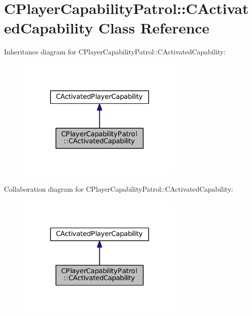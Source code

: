 \hypertarget{classCPlayerCapabilityPatrol_1_1CActivatedCapability}{}\section{C\+Player\+Capability\+Patrol\+:\+:C\+Activated\+Capability Class Reference}
\label{classCPlayerCapabilityPatrol_1_1CActivatedCapability}


Inheritance diagram for C\+Player\+Capability\+Patrol\+:\+:C\+Activated\+Capability\+:
\nopagebreak
\begin{figure}[H]
\begin{center}
\leavevmode
\includegraphics[width=227pt]{classCPlayerCapabilityPatrol_1_1CActivatedCapability__inherit__graph}
\end{center}
\end{figure}


Collaboration diagram for C\+Player\+Capability\+Patrol\+:\+:C\+Activated\+Capability\+:
\nopagebreak
\begin{figure}[H]
\begin{center}
\leavevmode
\includegraphics[width=227pt]{classCPlayerCapabilityPatrol_1_1CActivatedCapability__coll__graph}
\end{center}
\end{figure}
